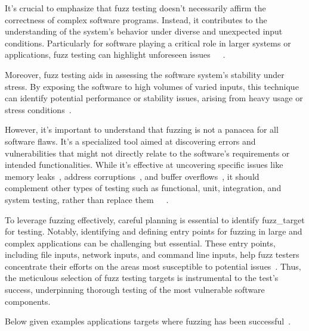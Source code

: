 It's crucial to emphasize that fuzz testing doesn't necessarily affirm the
correctness of complex software programs. Instead, it contributes to the
understanding of the system's behavior under diverse and unexpected input
conditions. Particularly for software playing a critical role in larger
systems or applications, fuzz testing can highlight unforeseen
issues~\cite{fuzzinga40:online}~\cite{demott2006evolving}~\cite{WhatisFu63:online}.

Moreover, fuzz testing aids in assessing the software system's stability under
stress. By exposing the software to high volumes of varied inputs, this
technique can identify potential performance or stability issues, arising
from heavy usage or stress conditions~\cite{demott2006evolving}.

However, it's important to understand that fuzzing is not a panacea for
all software flaws. It's a specialized tool aimed at discovering errors
and vulnerabilities that might not directly relate to the software's
requirements or intended functionalities. While it's effective at uncovering
specific issues like memory leaks~\cite{shahriar2014testing},
address corruptions~\cite{muench2018you}, and buffer overflows~\cite{godefroid2020fuzzing},
it should complement other types of testing such as functional, unit,
integration, and system testing, rather than replace
them~\cite{pietikainen2016steps}~\cite{UnitTest25:online}~\cite{WhatisFu63:online}.

To leverage fuzzing effectively, careful planning is essential to identify
\gls{fuzz_target} for testing. Notably, identifying and defining entry points
for fuzzing in large and complex applications can be challenging but essential.
These entry points, including file inputs, network inputs, and command
line inputs, help fuzz testers concentrate their efforts on the areas
most susceptible to potential issues~\cite{oehlert2005violating}.
Thus, the meticulous selection of
fuzz testing targets is instrumental to the test's success, underpinning
thorough testing of the most vulnerable software components.

Below given examples applications targets where fuzzing has been successful~\cite{fuzzingw44:online}.\label{par:target_categories}

